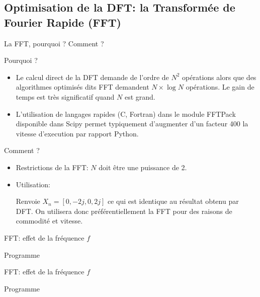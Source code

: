 \documentclass[8pt,a4paper]{beamer}
\begin{document}
\subsection{Optimisation de la DFT: la Transformée de Fourier Rapide (FFT)}

\begin{frame}{La FFT, pourquoi ? Comment ?}
\begin{block}{Pourquoi ?}
\begin{itemize}
\item Le calcul direct de la DFT demande de l'ordre de $N^2$ opérations alors que des algorithmes optimisés dits FFT demandent $N\times\log N$ opérations. Le gain de temps est très significatif quand $N$ est grand.
\item L'utilisation de langages rapides (C, Fortran) dans le module FFTPack disponible dans Scipy permet typiquement d'augmenter d'un facteur 400 la vitesse d'execution par rapport Python.
\end{itemize}
\end{block}

\begin{block}{Comment ?}
\begin{itemize}
\item Restrictions de la FFT: $N$ doit être une puissance de 2.
\item Utilisation:

Renvoie $X_n = [0,-2j,0,2j]$ ce qui est identique au résultat obtenu par DFT. On utilisera donc préférentiellement la FFT pour des raisons de commodité et vitesse.
\end{itemize}
\end{block}
\end{frame}

\begin{frame}{FFT: effet de la fréquence $f$}
\begin{block}{Programme}

\end{block}
\end{frame}
\begin{frame}{FFT: effet de la fréquence $f$}
\begin{block}{Programme}

\end{block}
\end{frame}
\end{document}
